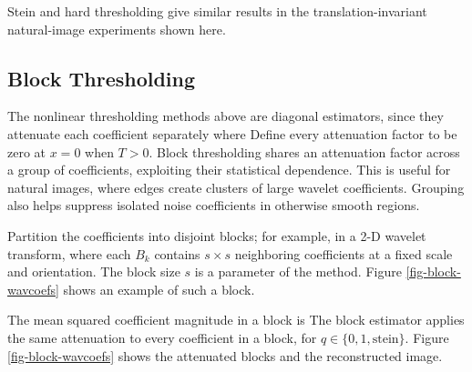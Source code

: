 
Stein and hard thresholding give similar results in the translation-invariant natural-image experiments shown here.

                                                     
\subsection{Block Thresholding}

The nonlinear thresholding methods above are diagonal estimators, since they attenuate each coefficient separately
where 
Define every attenuation factor to be zero at $x=0$ when $T>0$. Block thresholding shares an attenuation factor across a group of coefficients, exploiting their statistical dependence. This is useful for natural images, where edges create clusters of large wavelet coefficients. Grouping also helps suppress isolated noise coefficients in otherwise smooth regions.

Partition the coefficients into disjoint blocks; for example, in a 2-D wavelet transform,
where each $B_k$ contains $s\times s$ neighboring coefficients at a fixed scale and orientation. The block size $s$ is a parameter of the method.
Figure \ref{fig-block-wavcoefs} shows an example of such a block.

The mean squared coefficient magnitude in a block is
The block estimator
applies the same attenuation to every coefficient in a block,
for $q \in \{0,1,\text{stein}\}$.
Figure \ref{fig-block-wavcoefs} shows the attenuated blocks and the reconstructed image.


